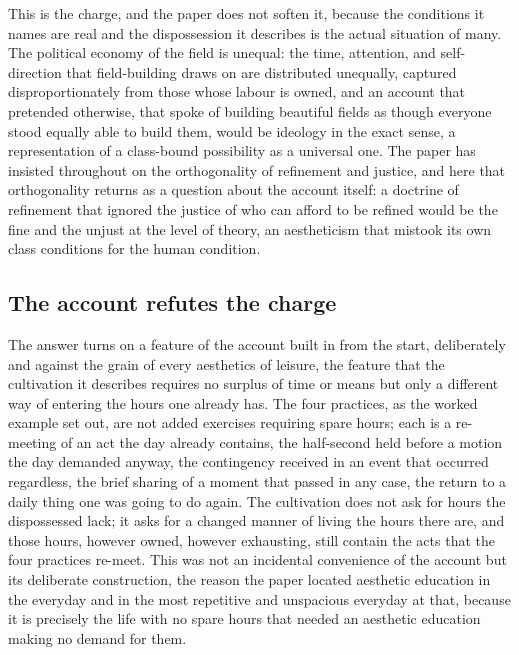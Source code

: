 This is the charge, and the paper does not soften it, because the conditions it names are real and the dispossession it describes is the actual situation of many. The political economy of the field is unequal: the time, attention, and self-direction that field-building draws on are distributed unequally, captured disproportionately from those whose labour is owned, and an account that pretended otherwise, that spoke of building beautiful fields as though everyone stood equally able to build them, would be ideology in the exact sense, a representation of a class-bound possibility as a universal one. The paper has insisted throughout on the orthogonality of refinement and justice, and here that orthogonality returns as a question about the account itself: a doctrine of refinement that ignored the justice of who can afford to be refined would be the fine and the unjust at the level of theory, an aestheticism that mistook its own class conditions for the human condition.

\subsection{The account refutes the charge}
\label{p22:sub:pe-refutation}

The answer turns on a feature of the account built in from the start, deliberately and against the grain of every aesthetics of leisure, the feature that the cultivation it describes requires no surplus of time or means but only a different way of entering the hours one already has. The four practices, as the worked example set out, are not added exercises requiring spare hours; each is a re-meeting of an act the day already contains, the half-second held before a motion the day demanded anyway, the contingency received in an event that occurred regardless, the brief sharing of a moment that passed in any case, the return to a daily thing one was going to do again. The cultivation does not ask for hours the dispossessed lack; it asks for a changed manner of living the hours there are, and those hours, however owned, however exhausting, still contain the acts that the four practices re-meet. This was not an incidental convenience of the account but its deliberate construction, the reason the paper located aesthetic education in the everyday and in the most repetitive and unspacious everyday at that, because it is precisely the life with no spare hours that needed an aesthetic education making no demand for them.


